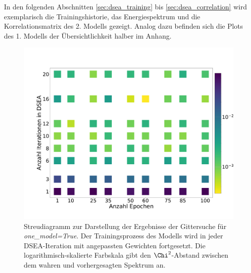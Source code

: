 In den folgenden Abschnitten \ref{sec:dsea_training} bis \ref{sec:dsea_correlation} wird exemplarisch die Trainingshistorie, das Energiespektrum und die Korrelationsmatrix des 2. Modells gezeigt.
Analog dazu befinden sich die Plots des 1. Modells der Übersichtlichkeit halber im Anhang.
\begin{figure}
    \centering
    \includegraphics[width=\textwidth]{Plots/DSEA/True/scatter_chi2.pdf}
    \caption[Ergebnisse der Gittersuche für ein NN in DSEA]{Streudiagramm zur Darstellung der Ergebnisse der Gittersuche für \textit{one\_model=True}.
    Der Trainingsprozess des Modells wird in jeder DSEA-Iteration mit angepassten Gewichten fortgesetzt.
    Die logarithmisch-skalierte Farbskala gibt den $\Chi^2$-Abstand zwischen dem wahren und vorhergesagten Spektrum an.
    }
    \label{fig:scatter_true}
\end{figure}

